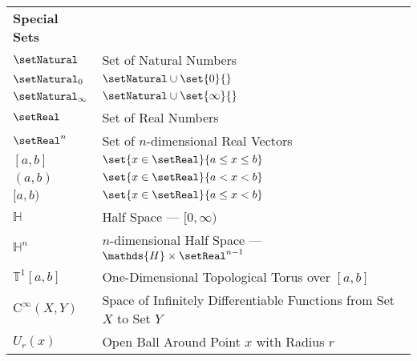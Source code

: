 \documentclass[crop=false,10pt,ngerman]{standalone}
\begin{document}
{\begin{tabularx}{\textwidth}{p{}p{}}
      \\
      \hline
      \textbf{Special Sets} & \\
      $\setNatural$ & Set of Natural Numbers \\
      $\setNatural_0$ & $\setNatural \cup \set{0}{}$ \\
      $\setNatural_\infty$ & $\setNatural \cup \set{\infty}{}$ \\
      $\setReal$ & Set of Real Numbers \\
      $\setReal^n$ & Set of $n$-dimensional Real Vectors \\
      $[a,b]$ & $\set{x\in\setReal}{a\leq x \leq b}$ \\
      $(a,b)$ & $\set{x\in\setReal}{a < x < b}$ \\
      $[a,b)$ & $\set{x\in\setReal}{a\leq x < b}$ \\
      $\mathds{H}$ & Half Space --- $[0,\infty)$ \\
      $\mathds{H}^n$ & $n$-dimensional Half Space --- $\mathds{H}\times\setReal^{n-1}$ \\
      $\mathds{T}^1[a,b]$ & One-Dimensional Topological Torus over $[a,b]$ \\
      $\mathrm{C}^\infty(X,Y)$ & Space of Infinitely Differentiable Functions from Set $X$ to Set $Y$ \\
      $U_r(x)$ & Open Ball Around Point $x$ with Radius $r$ \\




\end{tabularx}}
\end{document}
